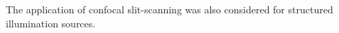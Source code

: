 The application of confocal \gls{slit-scanning} was also considered for structured illumination sources.
%
%
